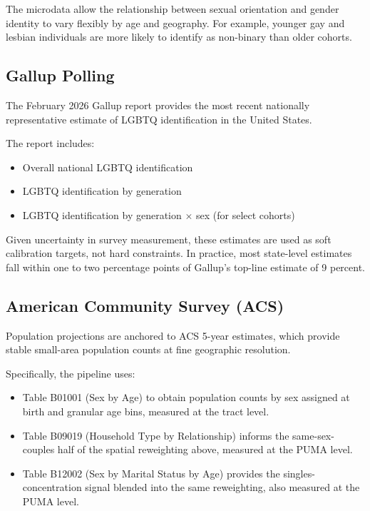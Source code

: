 \documentclass[11pt]{article}
\begin{document}
The microdata allow the relationship between sexual orientation and gender
identity to vary flexibly by age and geography. For example, younger gay and
lesbian individuals are more likely to identify as non-binary than older
cohorts.

\subsection*{Gallup Polling}

The February 2026 Gallup report provides the most recent nationally
representative estimate of LGBTQ identification in the United States.

The report includes:

\begin{itemize}[itemsep=0.1em]
\item Overall national LGBTQ identification
\item LGBTQ identification by generation
\item LGBTQ identification by generation $\times$ sex (for select cohorts)
\end{itemize}

Given uncertainty in survey measurement, these estimates are used as soft
calibration targets, not hard constraints. In practice, most state-level
estimates fall within one to two percentage points of Gallup's top-line
estimate of 9 percent.

\subsection*{American Community Survey (ACS)}

Population projections are anchored to ACS 5-year estimates, which provide
stable small-area population counts at fine geographic resolution.

Specifically, the pipeline uses:

\begin{itemize}[itemsep=0.1em]
\item Table B01001 (Sex by Age) to obtain population counts by sex assigned at
  birth and granular age bins, measured at the tract level.
\item Table B09019 (Household Type by Relationship) informs the
  same-sex-couples half of the spatial reweighting above, measured at the
  PUMA level.
\item Table B12002 (Sex by Marital Status by Age) provides the
  singles-concentration signal blended into the same reweighting, also
  measured at the PUMA level.
\end{itemize}
\end{document}
